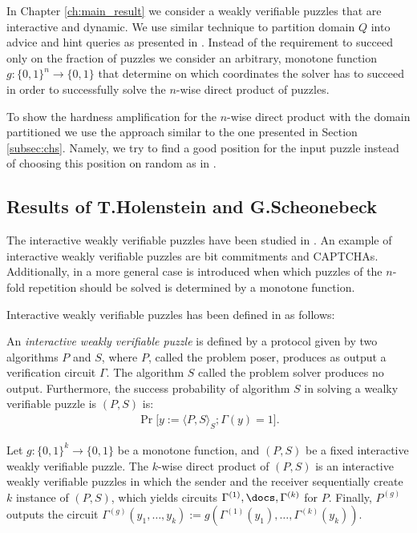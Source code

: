 In Chapter \ref{ch:main_result} we consider a weakly verifiable puzzles that are interactive and dynamic.
We use similar technique to partition domain $Q$ into advice and hint queries as presented in \cite{Dodis:2009:SAI:1530441.1530450}.
Instead of the requirement to succeed only on the fraction of puzzles we consider an arbitrary, monotone function $g : \{0,1\}^{n} \rightarrow \{0,1\}$
that determine on which coordinates the solver has to succeed in order to successfully solve the $n$-wise direct product of puzzles.

To show the hardness amplification for the $n$-wise direct product with the domain partitioned we use
the approach similar to the one presented in Section \ref{subsec:chs}. Namely, we try to find a good position for the input puzzle instead of
choosing this position on random as in \cite{Dodis:2009:SAI:1530441.1530450}.

\subsection{Results of T.Holenstein and G.Scheonebeck}
The interactive weakly verifiable puzzles have been studied in \cite{DBLP:journals/corr/abs-1002-3534}.
An example of interactive weakly verifiable puzzles are bit commitments and CAPTCHAs.
Additionally, in \cite{DBLP:journals/corr/abs-1002-3534} a more general case is introduced when
which puzzles of the $n$-fold repetition should be solved is determined by a monotone function.

Interactive weakly verifiable puzzles has been defined in \cite{DBLP:journals/corr/abs-1002-3534} as follows:
\begin{definition}
An \textit{interactive weakly verifiable puzzle} is defined by a protocol given by two algorithms $P$ and $S$,
where $P$, called the problem poser, produces as output a verification circuit $\Gamma$. The algorithm $S$ called the problem solver
produces no output.
Furthermore, the \textnormal{success probability} of algorithm $S$ in solving a wealky verifiable puzzle is $(P,S)$ is:
\begin{align*}
  \Pr\Big[y := \langle P,S \rangle_{S}; \Gamma(y) = 1 \Big].
\end{align*}
\end{definition}
\begin{definition}
Let $g: \{0,1\}^{k} \rightarrow \{0,1\}$ be a monotone function, and $(P,S)$ be a fixed interactive weakly verifiable puzzle.
The $k$-wise direct product of $(P,S)$ is an interactive weakly verifiable puzzles in which the sender and the receiver
sequentially create $k$ instance of $(P,S)$, which yields circuits $\Gamma^{(1)}, \docs, \Gamma^{(k)}$ for $P$.
Finally, $P^{(g)}$ outputs the circuit $\Gamma^{(g)}(y_1, \dotsc, y_k) := g(\Gamma^{(1)}(y_1), \dotsc, \Gamma^{(k)}(y_k))$.
\end{definition}



